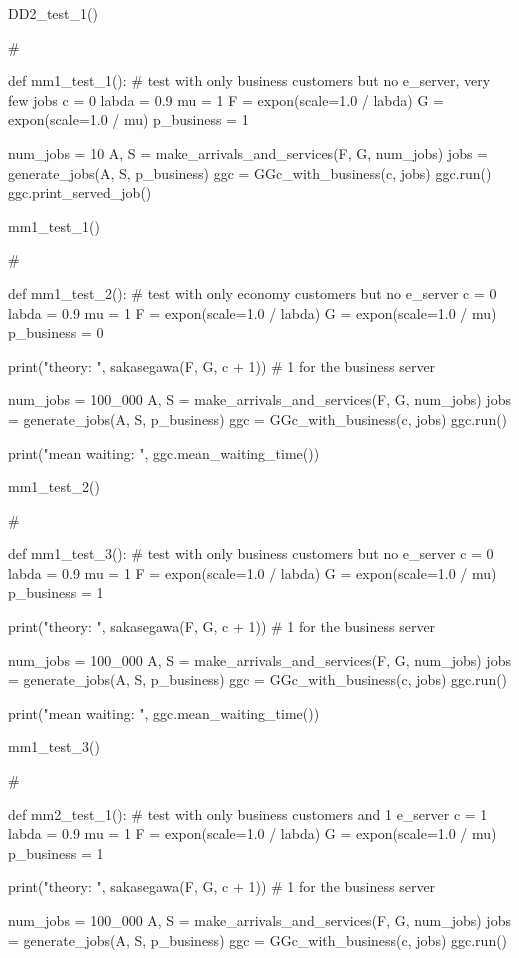 \begin{exercise}
\begin{solution}
\begin{pyverbatim}
DD2_test_1()

# %


def mm1_test_1():
    # test with only business customers but no e_server, very few jobs
    c = 0
    labda = 0.9
    mu = 1
    F = expon(scale=1.0 / labda)
    G = expon(scale=1.0 / mu)
    p_business = 1

    num_jobs = 10
    A, S = make_arrivals_and_services(F, G, num_jobs)
    jobs = generate_jobs(A, S, p_business)
    ggc = GGc_with_business(c, jobs)
    ggc.run()
    ggc.print_served_job()


mm1_test_1()

# %


def mm1_test_2():
    # test with only economy customers but no e_server
    c = 0
    labda = 0.9
    mu = 1
    F = expon(scale=1.0 / labda)
    G = expon(scale=1.0 / mu)
    p_business = 0

    print("theory: ", sakasegawa(F, G, c + 1))  # 1 for the business server

    num_jobs = 100_000
    A, S = make_arrivals_and_services(F, G, num_jobs)
    jobs = generate_jobs(A, S, p_business)
    ggc = GGc_with_business(c, jobs)
    ggc.run()

    print("mean waiting: ", ggc.mean_waiting_time())


mm1_test_2()

# %


def mm1_test_3():
    # test with only business customers but no e_server
    c = 0
    labda = 0.9
    mu = 1
    F = expon(scale=1.0 / labda)
    G = expon(scale=1.0 / mu)
    p_business = 1

    print("theory: ", sakasegawa(F, G, c + 1))  # 1 for the business server

    num_jobs = 100_000
    A, S = make_arrivals_and_services(F, G, num_jobs)
    jobs = generate_jobs(A, S, p_business)
    ggc = GGc_with_business(c, jobs)
    ggc.run()

    print("mean waiting: ", ggc.mean_waiting_time())


mm1_test_3()

# %


def mm2_test_1():
    # test with only business customers and 1 e_server
    c = 1
    labda = 0.9
    mu = 1
    F = expon(scale=1.0 / labda)
    G = expon(scale=1.0 / mu)
    p_business = 1

    print("theory: ", sakasegawa(F, G, c + 1))  # 1 for the business server

    num_jobs = 100_000
    A, S = make_arrivals_and_services(F, G, num_jobs)
    jobs = generate_jobs(A, S, p_business)
    ggc = GGc_with_business(c, jobs)
    ggc.run()


\end{pyverbatim}
\end{solution}
\end{exercise}
